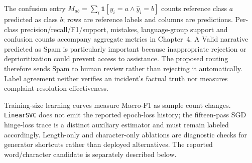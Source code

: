 The confusion entry $M_{ab}=\sum_i\mathbf{1}[y_i=a\land\hat y_i=b]$ counts reference class $a$ predicted as class $b$; rows are reference labels and columns are predictions. Per-class precision/recall/F1/support, mistakes, language-group support and confusion counts accompany aggregate metrics in Chapter~4. A Valid narrative predicted as Spam is particularly important because inappropriate rejection or deprioritization could prevent access to assistance. The proposed routing therefore sends Spam to human review rather than rejecting it automatically. Label agreement neither verifies an incident's factual truth nor measures complaint-resolution effectiveness.

Training-size learning curves measure Macro-F1 as sample count changes. \texttt{LinearSVC} does not emit the reported epoch-loss history; the fifteen-pass SGD hinge-loss trace is a distinct auxiliary estimator and must remain labeled accordingly. Length-only and character-only ablations are diagnostic checks for generator shortcuts rather than deployed alternatives. The reported word/character candidate is separately described below.



